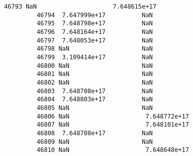 \documentclass[11pt]{article}
\begin{document}
\begin{Verbatim}[commandchars=\\\{\}]
         46793 NaN                     7.648615e+17       
         46794  7.647999e+17          NaN                 
         46795  7.648798e+17          NaN                 
         46796  7.648164e+17          NaN                 
         46797  7.648053e+17          NaN                 
         46798 NaN                    NaN                 
         46799  3.109414e+17          NaN                 
         46800 NaN                    NaN                 
         46801 NaN                    NaN                 
         46802 NaN                    NaN                 
         46803  7.648708e+17          NaN                 
         46804  7.648803e+17          NaN                 
         46805 NaN                    NaN                 
         46806 NaN                     7.648772e+17       
         46807 NaN                     7.648101e+17       
         46808  7.648708e+17          NaN                 
         46809 NaN                    NaN                 
         46810 NaN                     7.648648e+17       
         

\end{Verbatim}
\end{document}
